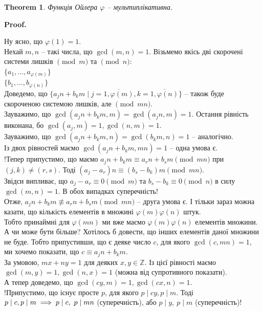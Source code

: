 \documentclass[a4paper, 10pt]{article}
\makeatletter
\theoremstyle{theoremdd}
\newtheorem{theorem}{Theorem}[subsection]
\theoremstyle{theoremdd}
\theoremstyle{theoremdd}
\theoremstyle{theoremdd}
\theoremstyle{theoremdd}
\theoremstyle{theoremdd}
\theoremstyle{theoremdd}
\theoremstyle{theoremdd}
\renewenvironment{proof}[1][Proof.\\]{\par
\pushQED{\hfill \qed}%
\normalfont \topsep6\p@\@plus6\p@\relax
\trivlist
\item\relax
{\bfseries
#1\@addpunct{.}}\hspace\labelsep\ignorespaces
}{%
\popQED\endtrivlist\@endpefalse
}
\makeatother
\begin{document}
\begin{theorem}
Функція Ойлера $\varphi$ -- мультиплікативна.
\end{theorem}

\begin{proof}
Ну ясно, що $\varphi(1) = 1$.\\
Нехай $m,n$ -- такі числа, що $\gcd(m,n) = 1$. Візьмемо якісь дві скорочені системи лишків $\!\!\pmod m$ та $\!\! \pmod n$:\\
$\{a_1,\dots,a_{\varphi(m)}\}$\\
$\{b_1,\dots,b_{\varphi(n)}\}$\\
Доведемо, що $\{a_j n + b_k m \mid j = \overline{1,\varphi(m)}, k = \overline{1,\varphi(n)}\}$ -- також буде скороченою системою лишків, але $\!\! \pmod {mn}$.\\
Зауважимо, що $\gcd(a_jn + b_km,m) = \gcd(a_jn,m) = 1$. Остання рівність виконана, бо $\gcd(a_j,m) = 1, \gcd(n,m) = 1$.\\
Зауважимо, що $\gcd(a_jn + b_km,n) = \gcd(b_km,n) = 1$ -- аналогічно.\\
Із двох рівностей маємо $\gcd(a_jn+b_km, mn) = 1$ -- одна умова є.\\
!Тепер припустимо, що маємо $a_j n + b_k m \equiv a_rn + b_sm \pmod {mn}$ при $(j,k) \neq (r,s)$. Тоді
$(a_j - a_r)n \equiv (b_s-b_k) m \pmod {mn}$.\\
Звідси випливає, що $a_j - a_r \equiv 0 \pmod {m}$ та $b_s - b_k \equiv 0 \pmod {n}$ в силу $\gcd(m,n)=1$. В обох випадках суперечність!\\
Отже, $a_j n + b_k m \not\equiv a_r n + b_s m \pmod {mn}$ -- друга умова є. І тільки зараз можна казати, що кількість елементів в множині $\varphi(m)\varphi(n)$ штук.\\
Тобто принаймні для $\varphi(mn)$ ми вже маємо $\varphi(m)\varphi(n)$ елементів множини. А чи може бути більше? Хотілось б довести, що інших елементів даної множини не буде. Тобто припустивши, що є деяке число $c$, для якого $\gcd(c,mn) = 1$, ми хочемо показати, що $c \equiv a_j n + b_k m$.\\
За умовою, $mx + ny = 1$ для деяких $x,y \in \mathbb{Z}$. Із цієї рівності маємо $\gcd(m,y) = 1, \gcd(n,x) = 1$ (можна від супротивного показати).\\
А тепер доведемо, що $\gcd(cy,m) = 1, \gcd(cx,n) = 1$.\\
!Припустимо, що існує просте $p$, для якого $p \mid cy, p \mid m$. Тоді $p \mid c,\\  p \mid m \implies p \mid c,\ p \mid mn$ (суперечність), або $p \mid y,\ p \mid m$ (суперечність)!\\

\end{proof}
\end{document}
